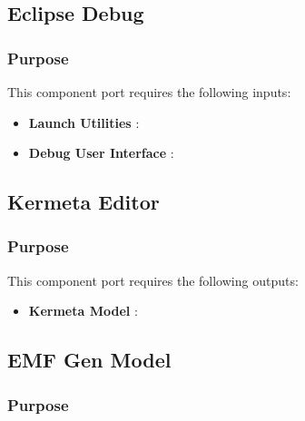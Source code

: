 \documentclass{gemoc} %
\begin{document}
\subsection{Eclipse Debug}


\subsubsection{Purpose}

This component port requires the following inputs:
\begin{itemize}
  \item \textbf{Launch Utilities} :
  \item \textbf{Debug User Interface} :
\end{itemize}


\subsection{Kermeta Editor}


\subsubsection{Purpose}


This component port requires the following outputs:
\begin{itemize}
  \item \textbf{Kermeta Model} :
\end{itemize}

\subsection{EMF Gen Model}


\subsubsection{Purpose}
\end{document}
